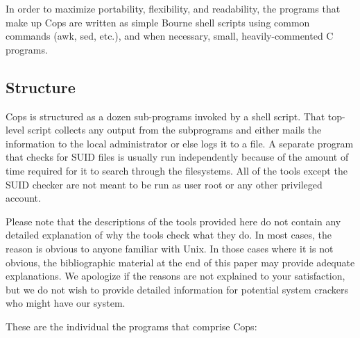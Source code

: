 In order to maximize portability, flexibility, and readability, the
programs that make up {\sc Cops} are written as simple Bourne shell scripts
using common  commands ({\sf awk, sed},
etc.), and when
necessary, small, heavily-commented  C programs.

\subsection{Structure}

{\sc Cops} is structured as a dozen sub-programs invoked by a shell
script.  That top-level script collects any output from the
subprograms and either mails the information to the local
administrator or else logs it to a file.  A separate program that
checks for SUID files is usually run independently because of the
amount of time required for it to search through the filesystems.  All
of the tools except the SUID checker are not meant to be run as
user  root or any other privileged account.

Please note that the descriptions of the tools provided here do not
contain any detailed explanation of why the tools check what they do.
In most cases, the reason is obvious to anyone familiar with
{\sc Unix}.  In those cases where it is not obvious, the bibliographic
material at the end of this paper may provide adequate explanations.
We apologize if the reasons are not explained to your satisfaction,
but we do not wish to provide detailed information for potential
system crackers who might have our system.

These are the individual the programs that comprise {\sc Cops}:

